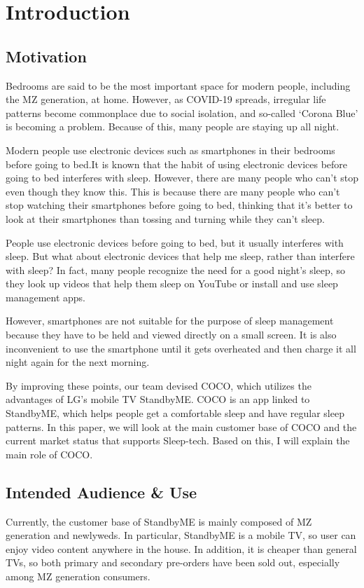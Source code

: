 \documentclass[conference]{IEEEtran}
\begin{document}
\section{Introduction}
\vspace{1\baselineskip}
\subsection{Motivation}
Bedrooms are said to be the most important space for modern people, including the MZ generation, at home. However, as COVID-19 spreads, irregular life patterns become commonplace due to social isolation, and so-called ‘Corona Blue’ is becoming a problem. Because of this, many people are staying up all night.

Modern people use electronic devices such as smartphones in their bedrooms before going to bed.It is known that the habit of using electronic devices before going to bed interferes with sleep. However, there are many people who can't stop even though they know this. This is because there are many people who can't stop watching their smartphones before going to bed, thinking that it's better to look at their smartphones than tossing and turning while they can't sleep.

People use electronic devices before going to bed, but it usually interferes with sleep. But what about electronic devices that help me sleep, rather than interfere with sleep? In fact, many people recognize the need for a good night's sleep, so they look up videos that help them sleep on YouTube or install and use sleep management apps.

However, smartphones are not suitable for the purpose of sleep management because they have to be held and viewed directly on a small screen. It is also inconvenient to use the smartphone until it gets overheated and then charge it all night again for the next morning.

By improving these points, our team devised COCO, which utilizes the advantages of LG's mobile TV StandbyME. COCO is an app linked to StandbyME, which helps people get a comfortable sleep and have regular sleep patterns. In this paper, we will look at the main customer base of COCO and the current market status that supports Sleep-tech. Based on this, I will explain the main role of COCO.
\vspace{1\baselineskip}
\subsection{Intended Audience \& Use}
Currently, the customer base of StandbyME is mainly composed of MZ generation and newlyweds. In particular, StandbyME is a mobile TV, so user can enjoy video content anywhere in the house. In addition, it is cheaper than general TVs, so both primary and secondary pre-orders have been sold out, especially among MZ generation consumers.
\end{document}
